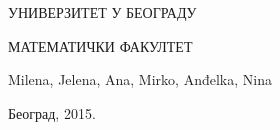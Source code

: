 \pagestyle{empty}

\begin{center}
{\sffamily

{\fontsize{16pt}{19pt}\selectfont УНИВЕРЗИТЕТ У БЕОГРАДУ}

{\fontsize{16pt}{19pt}\selectfont МАТЕМАТИЧКИ ФАКУЛТЕТ}
\vspace{150pt}

{\fontsize{16pt}{19pt}\selectfont Milena, Jelena, Ana, Mirko, Anđelka, Nina}

\vspace{50pt}
{\fontsize{22pt}{26pt}\selectfont {Zbirka programa}}

\vspace{230pt}


{\fontsize{14pt}{17pt}\selectfont Београд, 2015.}
}
\end{center}
